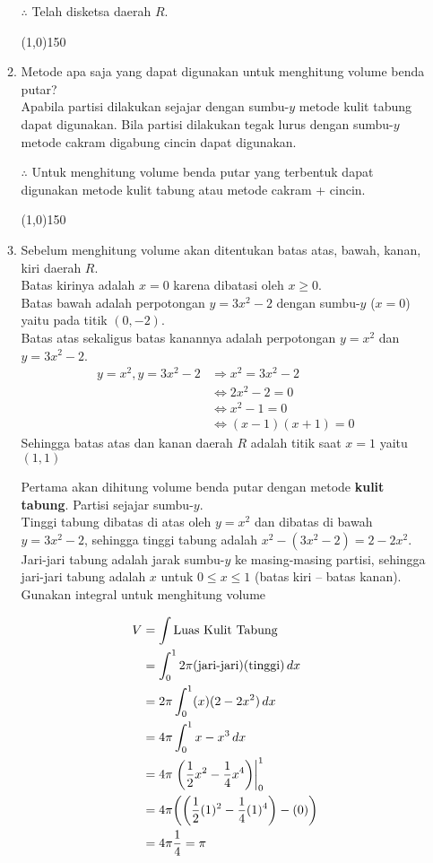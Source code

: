 \begin{enumerate}[leftmargin=*, label={\arabic*}.]
\begin{enumerate}[label={\alph*}.]
    $\therefore$ Telah disketsa daerah $R$.
\begin{center}
    \line(1,0){150}
\end{center}
    \item Metode apa saja yang dapat digunakan untuk menghitung volume benda putar?\\
    Apabila partisi dilakukan sejajar dengan sumbu-$y$ metode kulit tabung dapat digunakan. 
    Bila partisi dilakukan tegak lurus dengan sumbu-$y$ metode cakram digabung cincin dapat 
    digunakan.

    $\therefore$ Untuk menghitung volume benda putar yang terbentuk dapat digunakan metode 
    kulit tabung atau metode cakram + cincin.
\begin{center}
    \line(1,0){150}
\end{center}
    \item Sebelum menghitung volume akan ditentukan batas atas, bawah, kanan, kiri daerah $R$.\\
    Batas kirinya adalah $x=0$ karena dibatasi oleh $x\geq 0$.\\
    Batas bawah adalah perpotongan 
    $y=3x^{2}-2$ dengan sumbu-$y$ ($x=0$) yaitu pada titik $(0,-2)$.\\
    Batas atas sekaligus batas kanannya adalah perpotongan $y=x^{2}$ dan $y=3x^{2}-2$.
    \begin{align*}
        y=x^{2},y=3x^{2}-2 &\Longrightarrow x^{2}=3x^{2}-2\\
        &\iff 2x^{2}-2 = 0\\
        &\iff x^{2}-1=0\\
        &\iff (x-1)(x+1)=0
    \end{align*}
    Sehingga batas atas dan kanan daerah $R$ adalah titik saat $x=1$ yaitu $(1,1)$
    
    Pertama akan dihitung volume benda putar dengan metode \textbf{kulit tabung}. 
    Partisi sejajar sumbu-$y$.\\
    Tinggi tabung dibatas di atas oleh $y=x^{2}$ dan dibatas di bawah $y=3x^{2}-2$, 
    sehingga tinggi tabung adalah $x^{2}-(3x^{2}-2)=2-2x^{2}$.\\
    Jari-jari tabung adalah jarak sumbu-$y$ ke masing-masing partisi, sehingga 
    jari-jari tabung adalah $x$ untuk $0 \leq x \leq 1$ (batas kiri -- batas kanan).\\
    Gunakan integral untuk menghitung volume

    \begin{align*}
        V &= \int \text{Luas Kulit Tabung}\\
        &=\int_{0}^{1} 2\pi(\text{jari-jari})(\text{tinggi})\,dx\\
        &=2\pi\int_{0}^{1} (x)(2-2x^{2})\,dx\\
        &=4\pi\int_{0}^{1} x-x^{3}\,dx\\
        &=4\pi\eval{\frac{1}{2}x^{2}-\frac{1}{4}x^{4}}{0}{1}\\
        &=4\pi\brk*{\brk*{\frac{1}{2}(1)^{2}-\frac{1}{4}(1)^{4}}-(0)}\\
        &=4\pi\frac{1}{4} = \pi
    \end{align*}
    

\end{enumerate}
\end{enumerate}
